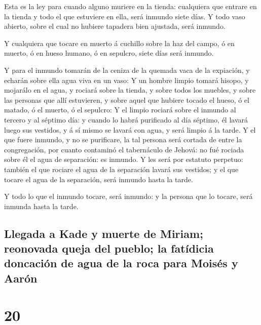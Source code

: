  Esta es la ley para cuando alguno muriere en la tienda:
cualquiera que entrare en la tienda y todo el que estuviere en ella,
será inmundo siete días.  Y todo vaso abierto, sobre el
cual no hubiere tapadera bien ajustada, será inmundo.

 Y cualquiera que tocare en muerto á cuchillo sobre la
haz del campo, ó en muerto, ó en hueso humano, ó en sepulcro, siete días
será inmundo.

 Y para el inmundo tomarán de la ceniza de la quemada
vaca de la expiación, y echarán sobre ella agua viva en un vaso:
 Y un hombre limpio tomará hisopo, y mojarálo en el agua,
y rociará sobre la tienda, y sobre todos los muebles, y sobre las
personas que allí estuvieren, y sobre aquel que hubiere tocado el hueso,
ó el matado, ó el muerto, ó el sepulcro:  Y el limpio
rociará sobre el inmundo al tercero y al séptimo día: y cuando lo habrá
purificado al día séptimo, él lavará luego sus vestidos, y á sí mismo se
lavará con agua, y será limpio á la tarde.  Y el que
fuere inmundo, y no se purificare, la tal persona será cortada de entre
la congregación, por cuanto contaminó el tabernáculo de Jehová: no fué
rociada sobre él el agua de separación: es inmundo.  Y
les será por estatuto perpetuo: también el que rociare el agua de la
separación lavará sus vestidos; y el que tocare el agua de la
separación, será inmundo hasta la tarde.

 Y todo lo que el inmundo tocare, será inmundo: y la
persona que lo tocare, será inmunda hasta la tarde.

\hypertarget{llegada-a-kade-y-muerte-de-miriam-reonovada-queja-del-pueblo-la-fatuxeddicia-doncaciuxf3n-de-agua-de-la-roca-para-moisuxe9s-y-aaruxf3n}{%
\subsection{Llegada a Kade y muerte de Miriam; reonovada queja del
pueblo; la fatídicia doncación de agua de la roca para Moisés y
Aarón}\label{llegada-a-kade-y-muerte-de-miriam-reonovada-queja-del-pueblo-la-fatuxeddicia-doncaciuxf3n-de-agua-de-la-roca-para-moisuxe9s-y-aaruxf3n}}

\hypertarget{section-19}{%
\section{20}\label{section-19}}

